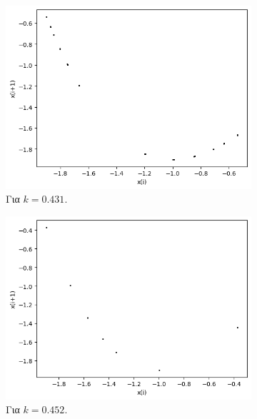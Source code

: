 \begin{figure}[h!]
	\centering
	
	\begin{subfigure}[b]{0.4\textwidth}
		\centering
		\includegraphics[width=\textwidth]{LateX images/graphs q19/g3}
		\caption{Για $k=0.431$.}
		\label{f:k92}
	\end{subfigure}
	\hfill
	\begin{subfigure}[b]{0.4\textwidth}
		\centering
		\includegraphics[width=\textwidth]{LateX images/graphs q19/g4}
		\caption{Για $k=0.452$.}
		\label{f:k93}
	\end{subfigure}
	\hfill
	\begin{subfigure}[b]{0.4\textwidth}
		\centering

\end{subfigure}
\end{figure}
